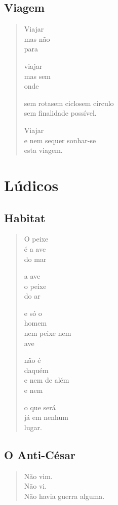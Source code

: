 \chapter{Viagem}

\begin{verse}
Viajar\\
mas não\\
para

viajar\\
mas sem\\
onde

sem rota\qquad\quad sem ciclo\qquad\quad sem círculo\\
sem finalidade possível.

Viajar\\
e nem sequer sonhar-se\\
esta viagem.
\end{verse}

\part*{Lúdicos}

\chapter{Habitat}

\begin{verse}
O peixe\\
é a ave\\
do mar

a ave\\
o peixe\\
do ar

e só o\\
homem\\
nem peixe nem\\
ave

não é\\
daquém\\
e nem de além\\
e nem

o que será\\
já em nenhum\\
lugar.
\end{verse}

\chapter{O Anti-César}

\begin{verse}
Não vim.\\
Não vi.\\
Não havia guerra alguma.
\end{verse}

